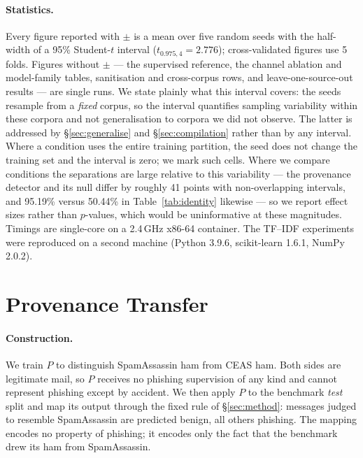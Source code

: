 \documentclass[twoside,11pt]{article}
\begin{document}
\paragraph{Statistics.} Every figure reported with $\pm$ is a mean over
five random seeds with the half-width of a 95\% Student-$t$ interval
($t_{0.975,4}=2.776$); cross-validated figures use 5 folds. Figures without
$\pm$ --- the supervised reference, the channel ablation and model-family
tables, sanitisation and cross-corpus rows, and leave-one-source-out results
--- are single runs. We state plainly
what this interval covers: the seeds resample from a \emph{fixed} corpus, so
the interval quantifies sampling variability within these corpora and not
generalisation to corpora we did not observe. The latter is addressed by
\S\ref{sec:generalise} and \S\ref{sec:compilation} rather than by any
interval. Where a condition uses the entire training partition, the seed does
not change the training set and the interval is zero; we mark such cells.
Where we compare conditions the separations are large relative to this
variability --- the provenance detector and its null differ by roughly 41
points with non-overlapping intervals, and 95.19\% versus 50.44\% in
Table~\ref{tab:identity} likewise --- so we report effect sizes rather than
$p$-values, which would be uninformative at these magnitudes. Timings are
single-core on a 2.4\,GHz x86-64 container. The TF--IDF experiments were
reproduced on a second machine (Python 3.9.6, scikit-learn 1.6.1,
NumPy 2.0.2).

\section{Provenance Transfer}
\label{sec:transfer}

\paragraph{Construction.}
We train $P$ to distinguish SpamAssassin ham from CEAS ham. Both sides are
legitimate mail, so $P$ receives no phishing supervision of any kind and
cannot represent phishing except by accident. We then apply $P$ to the
benchmark \emph{test} split and map its output through the fixed rule of
\S\ref{sec:method}: messages judged to resemble SpamAssassin are predicted
benign, all others phishing. The mapping encodes no property of phishing; it
encodes only the fact that the benchmark drew its ham from SpamAssassin.
\end{document}
